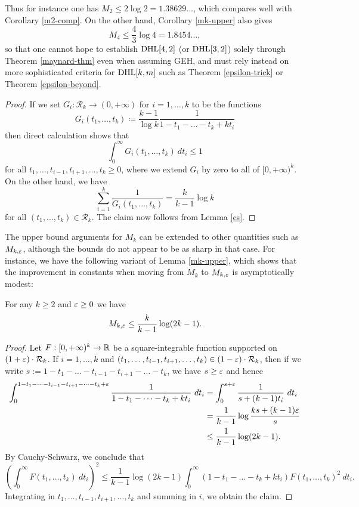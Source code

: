 Thus for instance one has $M_2 \leq 2 \log 2 = 1.38629\dots$, which compares well with Corollary \ref{m2-comp}.  On the other hand, Corollary \ref{mk-upper} also gives
$$ M_4 \leq \frac{4}{3} \log 4 = 1.8454\dots, $$
so that one cannot hope to establish $\operatorname*{DHL}[4,2]$ (or $\operatorname*{DHL}[3,2]$) solely through Theorem \ref{maynard-thm} even when assuming GEH, and must rely instead on more sophisticated criteria for $\operatorname*{DHL}[k,m]$ such as Theorem \ref{epsilon-trick} or Theorem \ref{epsilon-beyond}. 

\begin{proof}  If we set $G_i: {\mathcal R}_k \to (0,+\infty)$ for $i=1,\dots,k$ to be the functions
$$ G_i(t_1,\dots,t_k) \coloneqq \frac{k-1}{\log k} \frac{1}{1-t_1-\dots-t_k + kt_i} $$
then direct calculation shows that
$$ \int_0^\infty G_i(t_1,\dots,t_k)\ dt_i \leq 1$$
for all $t_1,\dots,t_{i-1},t_{i+1},\dots,t_k \geq 0$, where we extend $G_i$ by zero to all of $[0,+\infty)^k$.  On the other hand, we have
$$ \sum_{i=1}^k \frac{1}{G_i(t_1,\dots,t_k)} = \frac{k}{k-1} \log k$$
for all $(t_1,\dots,t_k) \in {\mathcal R}_k$.  The claim now follows from Lemma \ref{cs}.
\end{proof}

The upper bound arguments for $M_k$ can be extended to other quantities such as $M_{k,\varepsilon}$, although the bounds do not appear to be as sharp in that case.  For instance, we have the following variant of Lemma \ref{mk-upper}, which shows that the improvement in constants when moving from $M_k$ to $M_{k,\varepsilon}$ is asymptotically modest:

\begin{proposition}\label{mkeps}  For any $k \geq 2$ and $\varepsilon \geq 0$ we have
$$ M_{k,\varepsilon} \leq \frac{k}{k-1} \log(2k-1).$$
\end{proposition}

\begin{proof}  
Let $F: [0,+\infty)^k \to \mathbb{R}$ be a square-integrable function supported on $(1+\varepsilon) \cdot {\mathcal R}_k$.  If $i=1,\dots,k$ and $(t_1,\dots,t_{i-1},t_{i+1},\dots,t_k) \in (1-\varepsilon) \cdot {\mathcal R}_k$, then if we write $s := 1-t_1-\dots-t_{i-1}-t_{i+1}-\dots-t_k$, we have $s \geq \varepsilon$ and hence
\begin{align*}
\int_0^{1-t_1-\dots-t_{i-1}-t_{i+1}-\dots-t_k+\varepsilon} \frac{1}{1-t_1-\dots-t_k + kt_i}\ dt_i 
&= \int_0^{s+\varepsilon} \frac{1}{s+(k-1)t_i}\ dt_i \\
&= \frac{1}{k-1} \log \frac{ks + (k-1)\varepsilon}{s} \\
&\leq \frac{1}{k-1} \log(2k-1).
\end{align*}
By Cauchy-Schwarz, we conclude that
$$ \left(\int_0^\infty F(t_1,\dots,t_k)\ dt_i\right)^2 \leq \frac{1}{k-1} \log(2k-1) \int_0^\infty (1-t_1-\dots-t_k + k t_i) F(t_1,\dots,t_k)^2\ dt_i.$$
Integrating in $t_1,\dots,t_{i-1},t_{i+1},\dots,t_k$ and summing in $i$, we obtain the claim.
\end{proof}

